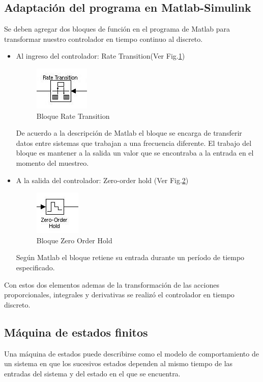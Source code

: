 \documentclass[journal]{IEEEtran}
\begin{document}
\subsection{Adaptación del programa en Matlab-Simulink}
Se deben agregar dos bloques de función en el programa de Matlab para transformar nuestro 
controlador en tiempo continuo al discreto.
\begin{itemize}
\item Al ingreso del controlador: Rate Transition(Ver Fig.\ref{fig:rate})
\begin{figure}[!t]
 \centering
  \includegraphics{rate.jpeg}
  \caption{Bloque Rate Transition}
  \label{fig:rate}
\end{figure}

De acuerdo a la descripción de Matlab el bloque se encarga de transferir datos 
entre sistemas que trabajan a una frecuencia diferente. El trabajo del bloque es mantener a 
la salida un valor que se encontraba a la entrada en el momento del muestreo.


\item A la salida del controlador: Zero-order hold (Ver Fig.\ref{fig:zero})
\begin{figure}[!t]
 \centering
  \includegraphics{zero_order.jpeg}
  \caption{Bloque Zero Order Hold }
  \label{fig:zero}
\end{figure}
Según Matlab el bloque retiene su entrada durante un período de tiempo especificado.
\end{itemize}

Con estos dos elementos ademas de la transformación de las acciones proporcionales, 
integrales y derivativas se realizó el controlador en tiempo discreto.

\subsection{Máquina de estados finitos}
\label{sec:MaqEstados}
Una máquina de estados puede describirse como el modelo de comportamiento de un sistema
en que los sucesivos estados dependen al mismo tiempo de las entradas del sistema y 
del estado en el que se encuentra. 
\end{document}
